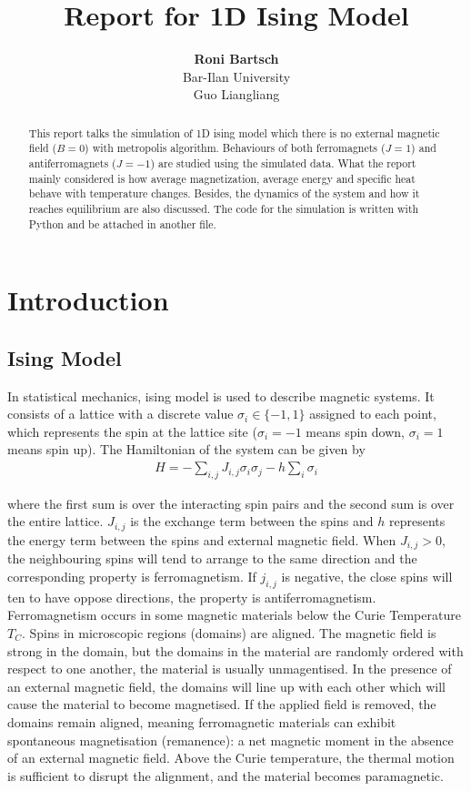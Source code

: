 \documentclass[12pt]{article}
\title{\Large{\textbf{Report for 1D Ising Model\\}}}
\author{\textbf{Roni Bartsch}\\
	Bar-Ilan University\\Guo Liangliang}
\date{}
\begin{document}
	\maketitle
	
	\begin{abstract}
		This report talks the simulation of 1D ising model which there is no external magnetic field ($B=0$) with metropolis algorithm. Behaviours of both ferromagnets ($J=1$) and antiferromagnets ($J=-1$) are studied using the simulated data. What the report mainly considered is how  average magnetization, average energy and specific heat behave with temperature changes. Besides, the dynamics of the system and how it reaches equilibrium are also discussed. The code for the simulation is written with Python and be attached in another file.
	\end{abstract}
	
	\section{Introduction}
	\label{sec: introduction}
	
	\subsection{Ising Model}
	\label{sec: ising model}
	In statistical mechanics, ising model is used to describe magnetic systems. It consists of a lattice with a discrete value $\sigma _i  \in \{-1,1\}$ assigned to each point, which represents the spin at the lattice site ($\sigma_i=-1$ means spin down, $\sigma_i=1$ means spin up). The Hamiltonian of the system can be given by 
	\begin{align}\label{equ: hamiltonian of ising model}
		H=-\sum_{i,j}J_{i,j}\sigma_i \sigma _j -h \sum_i \sigma_i
	\end{align}
	
	where the first sum is over the interacting spin pairs and the second sum is over the entire lattice. $J_{i,j}$ is the exchange term between the spins and $h$ represents the energy term between the spins and external magnetic field. When $J_{i,j}>0$, the neighbouring spins will tend to arrange to the same direction and the corresponding property is ferromagnetism. If $j_{i,j}$ is negative, the close spins will ten to have oppose directions, the property is antiferromagnetism.  Ferromagnetism occurs in some magnetic materials below the Curie Temperature $T_C$. Spins in microscopic regions (domains) are aligned. The magnetic field is strong in the domain, but the domains in the material are randomly ordered with respect to one another, the material is usually unmagentised. In the presence of an external magnetic field, the domains will line up with each other which will cause the material to become magnetised.  If the applied field is removed, the domains remain aligned, meaning ferromagnetic materials can exhibit spontaneous magnetisation (remanence): a net magnetic moment in the absence of an external magnetic field. Above the Curie temperature, the thermal motion is sufficient to disrupt the alignment, and the material becomes paramagnetic. 
	
\end{document}
